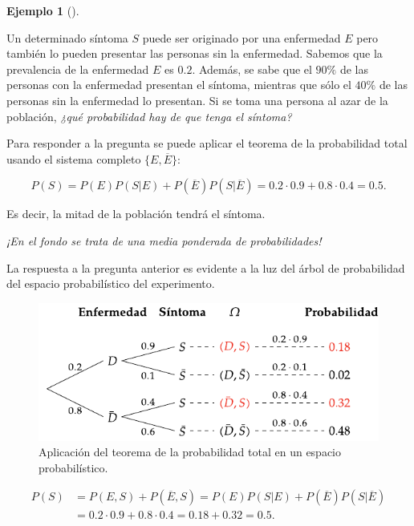 \documentclass[
  a4paper,
]{scrreport}
\theoremstyle{plain}
\theoremstyle{definition}
\theoremstyle{definition}
\newtheorem{example}{Ejemplo}[chapter]
\theoremstyle{remark}
\begin{document}
\begin{example}[]\protect\hypertarget{exm-probabilidad-total}{}\label{exm-probabilidad-total}

Un determinado síntoma \(S\) puede ser originado por una enfermedad
\(E\) pero también lo pueden presentar las personas sin la enfermedad.
Sabemos que la prevalencia de la enfermedad \(E\) es \(0.2\). Además, se
sabe que el \(90\%\) de las personas con la enfermedad presentan el
síntoma, mientras que sólo el \(40\%\) de las personas sin la enfermedad
lo presentan. Si se toma una persona al azar de la población, \emph{¿qué
probabilidad hay de que tenga el síntoma?}

Para responder a la pregunta se puede aplicar el teorema de la
probabilidad total usando el sistema completo \(\{E,\overline{E}\}\):

\[P(S) = P(E)P(S|E)+P(\overline E)P(S|\overline E) = 0.2\cdot 0.9 + 0.8\cdot 0.4 = 0.5.\]

Es decir, la mitad de la población tendrá el síntoma.

\emph{¡En el fondo se trata de una media ponderada de probabilidades!}

La respuesta a la pregunta anterior es evidente a la luz del árbol de
probabilidad del espacio probabilístico del experimento.

\begin{figure}[H]

{\centering \includegraphics{img/probabilidad/espacio_probabilistico_total.pdf}

}

\caption{Aplicación del teorema de la probabilidad total en un espacio
probabilístico.}

\end{figure}%

\begin{align*}
P(S) &= P(E,S) + P(\overline E,S) = P(E)P(S|E)+P(\overline E)P(S|\overline E)\\
& = 0.2\cdot 0.9+ 0.8\cdot 0.4 = 0.18 + 0.32 = 0.5.
\end{align*}

\end{example}
\end{document}
